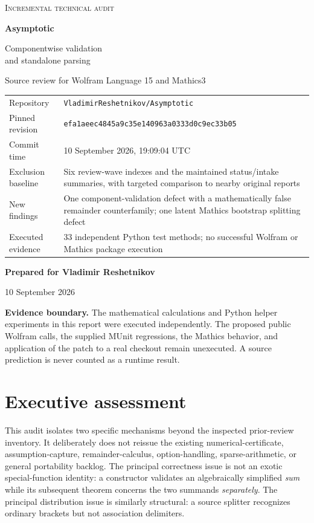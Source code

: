 \documentclass[11pt,letterpaper]{article}
\newcommand{\code}[1]{\nolinkurl{#1}}
\newcommand{\commit}{\code{efa1aeec4845a9c35e140963a0333d0c9ec33b05}}
\begin{document}
\begin{titlepage}
\vspace*{0.25in}
{\color{accent}\large\scshape Incremental technical audit}\par
\vspace{12pt}
{\color{ink}\Huge\bfseries Asymptotic}\par
\vspace{9pt}
{\LARGE Componentwise validation\\and standalone parsing}\par
\vspace{15pt}
{\large Source review for Wolfram Language 15 and Mathics3}\par
\vspace{22pt}
\begin{tabularx}{\linewidth}{@{}lY@{}}
\toprule
Repository & \code{VladimirReshetnikov/Asymptotic}\\
Pinned revision & \commit\\
Commit time & 10 September 2026, 19:09:04 UTC\\
Exclusion baseline & Six review-wave indexes and the maintained status/intake summaries, with targeted comparison to nearby original reports\\
New findings & One component-validation defect with a mathematically false remainder counterfamily; one latent Mathics bootstrap splitting defect\\
Executed evidence & 33 independent Python test methods; no successful Wolfram or Mathics package execution\\
\bottomrule
\end{tabularx}\par
\vspace{20pt}
\textbf{Prepared for Vladimir Reshetnikov}\par
10 September 2026
\vfill
\begin{minipage}{\linewidth}
\textbf{Evidence boundary.} The mathematical calculations and Python helper experiments in this report were executed independently. The proposed public Wolfram calls, the supplied MUnit regressions, the Mathics behavior, and application of the patch to a real checkout remain unexecuted. A source prediction is never counted as a runtime result.
\end{minipage}
\end{titlepage}

\section*{Executive assessment}
This audit isolates two specific mechanisms beyond the inspected prior-review inventory. It deliberately does not reissue the existing numerical-certificate, assumption-capture, remainder-calculus, option-handling, sparse-arithmetic, or general portability backlog. The principal correctness issue is not an exotic special-function identity: a constructor validates an algebraically simplified \emph{sum} while its subsequent theorem concerns the two summands \emph{separately}. The principal distribution issue is similarly structural: a source splitter recognizes ordinary brackets but not association delimiters.
\end{document}
